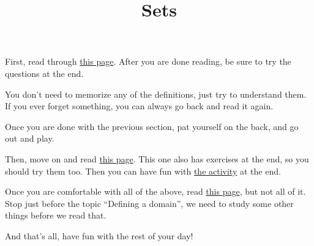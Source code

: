 \documentclass{article}
\title{Sets}
\begin{document}
\maketitle

First, read through \href{https://www.mathsisfun.com/sets/venn-diagrams.html}{this page}.
After you are done reading, be sure to try the questions at the end.

You don't need to memorize any of the definitions, just try to understand them.
If you ever forget something, you can always go back and read it again.

Once you are done with the previous section, pat yourself on the back, and go out and play.

Then, move on and read \href{https://www.mathsisfun.com/sets/sets-introduction.html}{this page}.
This one also has exercises at the end, so you should try them too.
Then you can have fun with \href{https://www.mathsisfun.com/activity/subsets.html}{the activity} at the end.

Once you are comfortable with all of the above, read
\href{https://www.mathsisfun.com/sets/set-builder-notation.html}{this page}, but not all of it.
Stop just before the topic ``Defining a domain'', we need to study some other things before we read that.

And that's all, have fun with the rest of your day!
\end{document}
